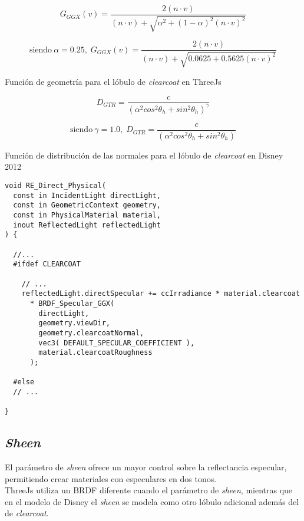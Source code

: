   $$
  G_{GGX}(v) = \frac
  {2 (n \cdot{v})}
  {(n \cdot{v}) + \sqrt{ \alpha^2 + (1 - \alpha)^2 (n \cdot{v})^2 }}
  $$
  \begin{eqfloat}[!htb]
    \begin{equation}
    \textrm{siendo}\ \alpha=0.25,\;
    G_{GGX}(v) = \frac
    {2 (n \cdot{v})}
    {(n \cdot{v}) + \sqrt{ 0.0625 + 0.5625 (n \cdot{v})^2 }}
    \end{equation}
  \caption{Funci\'on de geometr\'ia para el l\'obulo de \textit{clearcoat} en ThreeJs}
  \end{eqfloat}
  \singlespacing

  $$
  D_{GTR} = \frac
  {c}
  {(\alpha^2 cos^2 \theta_h + sin^2 \theta_h)^\gamma}
  $$
  \begin{eqfloat}[!htb]
    \begin{equation}
    \textrm{siendo}\ \gamma=1.0,\;
    D_{GTR} = \frac
    {c}
    {(\alpha^2 cos^2 \theta_h + sin^2 \theta_h)}
    \end{equation}
  \caption{Funci\'on de distribuci\'on de las normales para el l\'obulo de \textit{clearcoat} en Disney 2012}
  \end{eqfloat}
  \singlespacing

  \begin{lstlisting}[caption={Implementaci\'on del l\'obulo de \textit{clearcoat} en ThreeJs}]
void RE_Direct_Physical(
  const in IncidentLight directLight,
  const in GeometricContext geometry,
  const in PhysicalMaterial material,
  inout ReflectedLight reflectedLight
) {

  //...
  #ifdef CLEARCOAT

    // ...
    reflectedLight.directSpecular += ccIrradiance * material.clearcoat
      * BRDF_Specular_GGX(
        directLight,
        geometry.viewDir,
        geometry.clearcoatNormal,
        vec3( DEFAULT_SPECULAR_COEFFICIENT ),
        material.clearcoatRoughness
      );

  #else
  // ...

}
  \end{lstlisting}
  
  \subsection*{\textit{Sheen}}
  El par\'ametro de \textit{sheen} ofrece un mayor control sobre la reflectancia especular, permitiendo crear materiales con
  especulares en dos tonos.\\

  ThreeJs utiliza un BRDF diferente cuando el par\'ametro de \textit{sheen}, mientras que en el modelo de Disney el \textit{sheen}
  se modela como otro l\'obulo adicional adem\'as del de \textit{clearcoat}.\\

